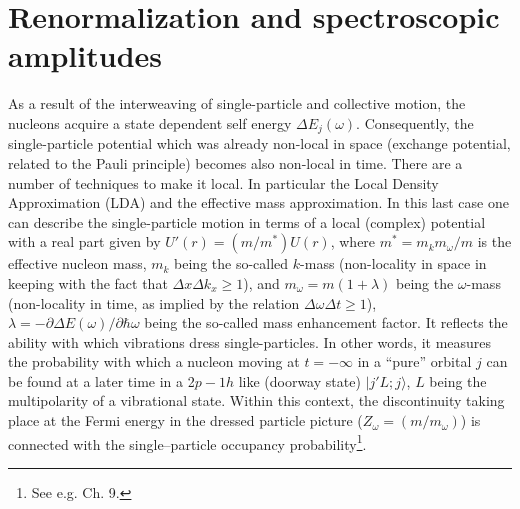 \section{Renormalization and spectroscopic amplitudes}
As a result of the interweaving of single-particle and collective motion, the nucleons acquire a state dependent self energy $\Delta E_j(\omega)$.   Consequently, the single-particle potential which was already non-local in space (exchange potential, related to the Pauli principle) becomes also non-local in time. There are a number of techniques to make it local. In particular the Local Density Approximation (LDA) and the effective mass approximation. In this last case one can describe the single-particle motion in terms of a local (complex) potential with a real part given by $U'(r)=(m/m^*)U(r)$, where $m^*=m_km_\omega/m$ is the effective nucleon mass, $m_k$ being the so-called $k$-mass (non-locality in space in keeping with the fact that $\Delta x\Delta k_x\geq1$), and $m_\omega=m(1+\lambda)$ being the $\omega$-mass (non-locality in time, as implied by the relation $\Delta \omega\Delta t\geq1$),  $\lambda=-\partial \Delta E(\omega)/\partial \hbar \omega$ being the so-called mass enhancement factor. It reflects the ability with which vibrations dress single-particles. In other words, it measures the probability with which a nucleon moving at  $t=-\infty$ in a ``pure'' orbital $j$ can be found at a later time in a 2$p-1h$ like (doorway state) $|j'L;j\rangle$, $L$ being the multipolarity of a vibrational state. Within this context, the discontinuity taking place at the Fermi energy in the dressed particle picture ($Z_\omega=(m/m_\omega)$) is connected with the single--particle occupancy probability\footnote{See e.g. \cite{Brink:05} Ch. 9.}.


